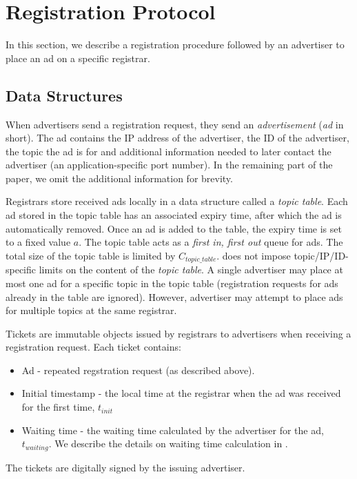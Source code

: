 \section{Registration Protocol}\label{sec:registration_single}
In this section, we describe a registration procedure followed by an advertiser to place an ad on a specific registrar. 
\subsection{Data Structures}
When advertisers send a registration request, they send an \emph{advertisement} (\emph{ad} in short). The ad contains the IP address of the advertiser, the ID of the advertiser, the topic the ad is for and additional information needed to later contact the advertiser (\eg an application-specific port number). In the remaining part of the paper, we omit the additional information for brevity. 

Registrars store received ads locally in a data structure called a \emph{topic table}. Each ad stored in the topic table has an associated expiry time, after which the ad is automatically removed. Once an ad is added to the table, the expiry time is set to a fixed value $a$. The topic table acts as a \emph{first in, first out} queue for ads. The total size of the topic table is limited by $C_\textit{topic\_table}$. \sysname does not impose topic/IP/ID-specific limits on the content of the \emph{topic table}. 
A single advertiser may place at most one ad for a specific topic in the topic table (registration requests for ads already in the table are ignored). However, advertiser may attempt to place ads for multiple topics at the same registrar.

Tickets are immutable objects issued by registrars to advertisers when receiving a registration request. Each ticket contains:
\begin{itemize}
    \item Ad - repeated regstration request (as described above). 
    \item Initial timestamp - the local time at the registrar when the ad was received for the first time, $t_\textit{init}$
    \item Waiting time - the waiting time calculated by the advertiser for the ad, $t_\textit{waiting}$. We describe the details on waiting time calculation in . 
\end{itemize}
The tickets are digitally signed by the issuing advertiser. 

